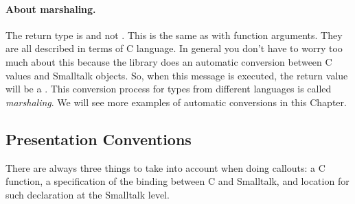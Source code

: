 \documentclass[a4paper,10pt,twoside]{book}
\begin{document}
\paragraph{About marshaling.} The return type is  and not . This is the same as with function arguments. They are all described in terms of C language. In general you don't have to worry too much about this because the \Spock library does an automatic conversion between C values and Smalltalk objects. So, when this message is executed, the return value will be a . 
This conversion process for types from different languages is called \emph{marshaling}.
We will see more examples of automatic conversions in this Chapter. 

\subsection{Presentation Conventions}

There are always three things to take into account when doing callouts:  a C function, a specification of the binding between C and Smalltalk, and location for such declaration at the Smalltalk level. 
\end{document}
